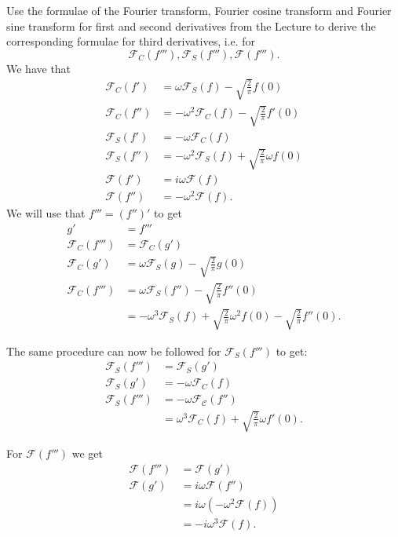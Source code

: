 Use the formulae of the Fourier transform, Fourier cosine transform and Fourier sine transform for first and second derivatives from the Lecture to derive the corresponding formulae for third derivatives, i.e. for
\[ 
\mathcal{F}_C \left( f''' \right), \mathcal{F}_S \left( f''' \right), \mathcal{F} \left( f''' \right)
.\]
\hr
We have that
\begin{align*}
  \mathcal{F}_C (f') &= \omega \mathcal{F}_S (f) - \sqrt{\frac{2}{\pi}} f(0) \\
  \mathcal{F}_C (f'') &= - \omega^2 \mathcal{F}_C (f) - \sqrt{\frac{2}{\pi}}f'(0) \\
  \mathcal{F}_S (f') &= - \omega \mathcal{F}_C (f) \\
  \mathcal{F}_S (f'') &= - \omega^2 \mathcal{F}_S(f) + \sqrt{\frac{2}{\pi}} \omega f(0) \\
  \mathcal{F}(f') &= i \omega \mathcal{F}(f) \\
  \mathcal{F}(f'') &= - \omega^2 \mathcal{F}(f)
.\end{align*}
We will use that $f''' = (f'')'$ to get
\begin{align*}
  g' &= f''' \\
  \mathcal{F}_C (f''') &= \mathcal{F}_C (g') \\
  \mathcal{F}_C(g') &= \omega \mathcal{F}_S \left( g \right) - \sqrt{\frac{2}{\pi}} g(0) \\
  \mathcal{F}_C \left( f''' \right) &= \omega \mathcal{F}_S (f'') - \sqrt{\frac{2}{\pi}} f''(0) \\
  &= - \omega^3 \mathcal{F}_S (f) + \sqrt{\frac{2}{\pi}} \omega^2 f(0) - \sqrt{\frac{2}{\pi}} f''(0)
.\end{align*}

The same procedure can now be followed for $\mathcal{F}_S(f''')$ to get:
\begin{align*}
  \mathcal{F}_S(f''') &= \mathcal{F}_S (g') \\
  \mathcal{F}_S (g')  &= - \omega \mathcal{F}_C (f) \\
  \mathcal{F}_S (f''') &= - \omega \mathcal{F_C}(f'') \\
  &= \omega^3 \mathcal{F}_C (f) + \sqrt{\frac{2}{\pi}} \omega f'(0)
.\end{align*}

For $\mathcal{F} (f''')$ we get
\begin{align*}
  \mathcal{F}(f''') &= \mathcal{F}(g') \\
  \mathcal{F}(g') &= i \omega \mathcal{F}(f'') \\
  &= i \omega \left( - \omega^2 \mathcal{F}(f) \right)\\
  &= - i \omega^3 \mathcal{F}(f)
.\end{align*}

